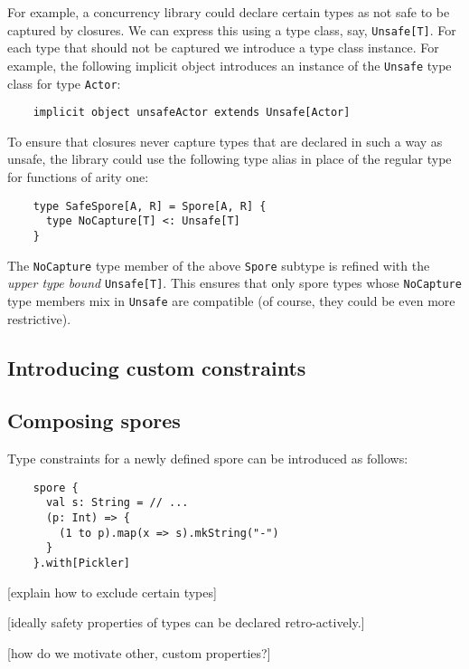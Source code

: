 \documentclass{llncs}
\begin{document}
For example, a concurrency library could declare certain types as not safe to
be captured by closures. We can express this using a type class, say,
\verb|Unsafe[T]|. For each type that should not be captured we introduce a
type class instance. For example, the following implicit object introduces an
instance of the \verb|Unsafe| type class for type \verb|Actor|:

\begin{lstlisting}
    implicit object unsafeActor extends Unsafe[Actor]
\end{lstlisting}
\noindent
To ensure that closures never capture types that are declared in such a way as
unsafe, the library could use the following type alias in place of the regular
type for functions of arity one:

\begin{lstlisting}
    type SafeSpore[A, R] = Spore[A, R] {
      type NoCapture[T] <: Unsafe[T]
    }
\end{lstlisting}
\noindent
The \verb|NoCapture| type member of the above \verb|Spore| subtype is refined
with the {\em upper type bound} \verb|Unsafe[T]|. This ensures that only spore
types whose \verb|NoCapture| type members mix in \verb|Unsafe| are compatible
(of course, they could be even more restrictive).

\subsection{Introducing custom constraints}

\subsection{Composing spores}


Type constraints for a newly defined spore can be introduced as follows:
\begin{lstlisting}
    spore {
      val s: String = // ...
      (p: Int) => {
        (1 to p).map(x => s).mkString("-")
      }
    }.with[Pickler]
\end{lstlisting}
\noindent

[explain how to exclude certain types]

[ideally safety properties of types can be declared retro-actively.]

[how do we motivate other, custom properties?]



\end{document}
